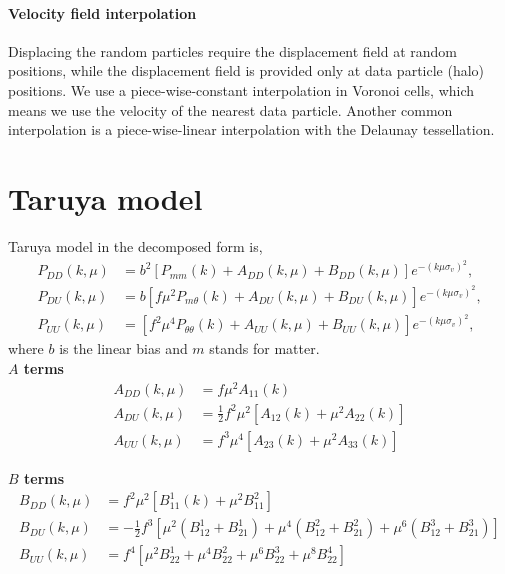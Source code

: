\documentclass[a4paper,11pt, fleqn]{article}
\begin{document}
\paragraph{Velocity field interpolation}

Displacing the random particles require the displacement field at
random positions, while the displacement field is provided only at
data particle (halo) positions. We use a piece-wise-constant
interpolation in Voronoi cells, which means we use the velocity of the
nearest data particle. Another common interpolation is a
piece-wise-linear interpolation with the Delaunay tessellation.


%
%
\newpage
\section{Taruya model}

\vspace{5mm}

Taruya model in the decomposed form is,\vspace{-2mm}
\begin{align}
  P_{DD}(k, \mu) &= b^2 \left[
    P_{mm}(k) + A_{DD}(k, \mu) + B_{DD}(k, \mu)
    \right] e^{- (k\mu\sigma_v)^2},\\
  P_{DU}(k, \mu) &= b \left[
    f\mu^2 P_{m\theta}(k) + A_{DU}(k, \mu) + B_{DU}(k, \mu)
    \right] e^{- (k\mu\sigma_v)^2},\\
  P_{UU}(k, \mu) &= \left[
    f^2 \mu^4 P_{\theta\theta}(k) + A_{UU}(k, \mu) + B_{UU}(k, \mu)
    \right] e^{- (k\mu\sigma_v)^2},   
\end{align}
where $b$ is the linear bias and $m$ stands for matter.\\


\textbf{$A$ terms}\vspace{-2mm}
\begin{align}
  A_{DD}(k, \mu) &= f\mu^2 A_{11}(k)\\
  A_{DU}(k, \mu) &= \frac{1}{2} f^2 \mu^2 \left[
                   A_{12}(k) + \mu^2 A_{22}(k) \right]\\
  A_{UU}(k, \mu) &= f^3 \mu^4 \left[ A_{23}(k) + \mu^2 A_{33}(k) \right]
\end{align}

\textbf{$B$ terms}\vspace{-2mm}
\begin{align}
  B_{DD}(k, \mu) &= f^2 \mu^2 \left[ B^1_{11}(k) + \mu^2 B^2_{11} \right]\\
  B_{DU}(k, \mu) &= -\frac{1}{2} f^3 \left[
    \mu^2( B^1_{12} + B^1_{21} ) + \mu^4(B^2_{12} + B^2_{21})
    + \mu^6(B^3_{12} + B^3_{21}) \right]\\
  B_{UU}(k, \mu) &= f^4 \left[ \mu^2 B^1_{22} + \mu^4 B^2_{22} + \mu^6
    B^3_{22} + \mu^8 B^4_{22}\right]
\end{align}
\end{document}
